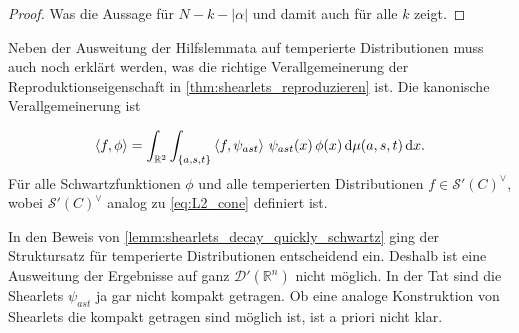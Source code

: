 \begin{proof}
    Was die Aussage für $N-k-|\alpha|$ und damit auch für alle $k$ zeigt.
\end{proof}

Neben der Ausweitung der Hilfslemmata auf temperierte Distributionen muss auch noch erklärt werden, was die richtige Verallgemeinerung der Reproduktionseigenschaft in \cref{thm:shearlets_reproduzieren} ist. Die kanonische Verallgemeinerung ist

\begin{equation*}
    \left\langle f,\phi\right\rangle = \int_{\mathbb{R}^2} \int_{\{a,s,t\}}
    \left\langle f,\psi_{ast}\right\rangle\, \psi_{ast}(x) \,\phi(x)
    \mathop{}\!\mathrm{d} \mu(a,s,t) \mathop{}\!\mathrm{d} x
    .
\end{equation*}
Für alle Schwartzfunktionen $\phi$ und alle temperierten Distributionen $f \in \mathcal{S}'(C)^\vee$, wobei $\mathcal{S}'(C)^\vee$ analog zu \cref{eq:L2_cone} definiert ist.


In den Beweis von \cref{lemm:shearlets_decay_quickly_schwartz} ging der Struktursatz für temperierte Distributionen entscheidend ein. Deshalb ist eine Ausweitung der Ergebnisse auf ganz $\mathcal{D}'(\mathbb{R}^n)$ nicht möglich. In der Tat sind die Shearlets $\psi_{ast}$ ja gar nicht kompakt getragen.
Ob eine analoge Konstruktion von Shearlets die kompakt getragen sind möglich ist, ist a priori nicht klar.


